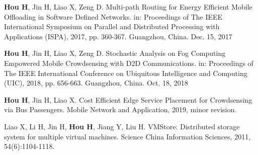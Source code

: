 \documentclass[format=draft,language=chinese,degree=phd,table,usenames,dvipsnames]{hustthesis}
\begin{document}
\begin{publications}
\item \textbf{Hou H}, Jin H, Liao X, Zeng D. Multi-path Routing for Energy Efficient Mobile Offloading in Software Defined Networks. in: Proceedings of The IEEE International Symposium on Parallel and Distributed Processing with Applications (ISPA), 2017, pp. 360-367. Guangzhou, China. Dec. 15, 2017 %
\item \textbf{Hou H}, Jin H, Liao X, Zeng D. Stochastic Analysis on Fog Computing Empowered Mobile Crowdsensing with D2D Communications. in: Proceedings of The IEEE International Conference on Ubiquitous Intelligence and Computing (UIC), 2018, pp. 656-663.  Guangzhou, China. Oct. 18, 2018 %
\item \textbf{Hou H}, Jin H, Liao X. Cost Efficient Edge Service Placement for Crowdsensing via Bus Passengers. Mobile Network and Application, 2019, minor revision.
\item Liao X, Li H, Jin H, \textbf{Hou H}, Jiang Y, Liu H. VMStore: Distributed storage system for multiple virtual machines. Science China Information Sciences, 2011, 54(6):1104-1118. %

\end{publications}
\end{document}
